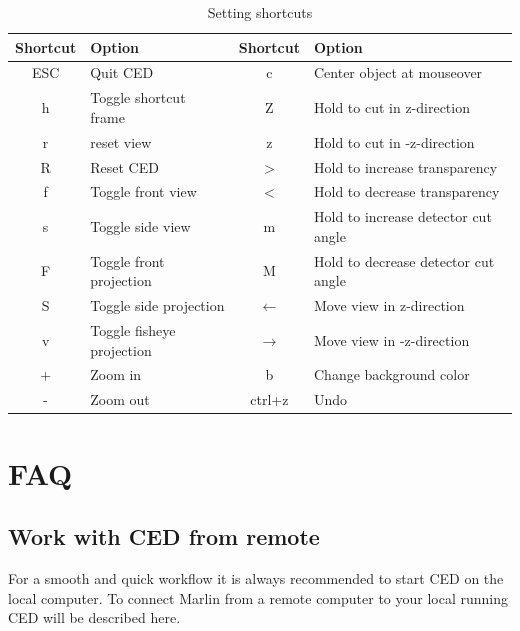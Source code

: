 \documentclass[a4paper,10pt]{article}
\begin{document}
\begin{center}
\begin{table}
 \begin{tabular}[ht]{|c|l||c|l|}
  \hline
  Shortcut & Option & Shortcut & Option\\
  \hline\hline
ESC & Quit CED                        &c   & Center object at mouseover          \\ 
h   & Toggle shortcut frame           &Z   & Hold to cut in z-direction          \\ 
r   & reset view                      &z   & Hold to cut in -z-direction         \\ 
R   & Reset CED                       &$>$   & Hold to increase transparency       \\ 
f   & Toggle front view               &$<$   & Hold to decrease transparency       \\ 
s   & Toggle side view                &m   & Hold to increase detector cut angle \\ 
F   & Toggle front projection         &M   & Hold to decrease detector cut angle \\ 
S   & Toggle side projection          &$\leftarrow$  & Move view in z-direction            \\ 
v   & Toggle fisheye projection       &$\rightarrow$  & Move view in -z-direction           \\ 
+   & Zoom in                         &b   & Change background color             \\ 
-   & Zoom out                        & ctrl+z & Undo                            \\                     
\hline
\end{tabular}
\label{controlshortcuts}
\caption{Setting shortcuts}
\end{table}
\end{center}



\section{FAQ}
\subsection{Work with CED from remote}
For a smooth and quick workflow it is always recommended to start CED on the local computer. 
To connect Marlin from a remote computer to your local running CED will be described here.
\end{document}

